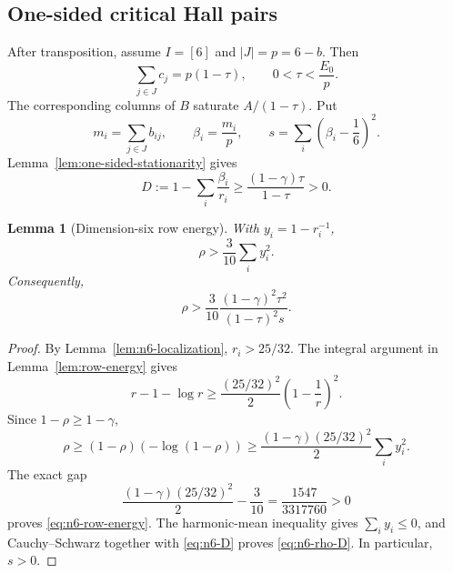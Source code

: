 \documentclass[11pt]{article}
\newtheorem{lemma}[theorem]{Lemma}
\theoremstyle{definition}
\newcommand{\1}{\mathbf{1}}
\begin{document}
\subsection{One-sided critical Hall pairs}

After transposition, assume $I=[6]$ and $|J|=p=6-b$.  Then
\begin{equation}\label{eq:n6-one-sided-mass}
 \sum_{j\in J}c_j=p(1-\tau),
 \qquad
 0<\tau<\frac{E_0}{p}.
\end{equation}
The corresponding columns of $B$ saturate $A/(1-\tau)$.  Put
\[
 m_i=\sum_{j\in J}b_{ij},
 \qquad
 \beta_i=\frac{m_i}{p},
 \qquad
 s=\sum_i\left(\beta_i-\frac16\right)^2.
\]
Lemma~\ref{lem:one-sided-stationarity} gives
\begin{equation}\label{eq:n6-D}
 D:=1-\sum_i\frac{\beta_i}{r_i}
 \ge\frac{(1-\gamma)\tau}{1-\tau}>0.
\end{equation}

\begin{lemma}[Dimension-six row energy]\label{lem:n6-row-energy}
With $y_i=1-r_i^{-1}$,
\begin{equation}\label{eq:n6-row-energy}
 \rho>\frac3{10}\sum_i y_i^2.
\end{equation}
Consequently,
\begin{equation}\label{eq:n6-rho-D}
 \rho>\frac3{10}
 \frac{(1-\gamma)^2\tau^2}{(1-\tau)^2s}.
\end{equation}
\end{lemma}

\begin{proof}
By Lemma~\ref{lem:n6-localization}, $r_i>25/32$.  The integral argument in
Lemma~\ref{lem:row-energy} gives
\[
 r-1-\log r\ge\frac{(25/32)^2}{2}
 \left(1-\frac1r\right)^2.
\]
Since $1-\rho\ge1-\gamma$,
\[
 \rho\ge(1-\rho)(-\log(1-\rho))
 \ge\frac{(1-\gamma)(25/32)^2}{2}\sum_i y_i^2.
\]
The exact gap
\begin{equation}\label{eq:n6-energy-gap}
 \frac{(1-\gamma)(25/32)^2}{2}-\frac3{10}
 =\frac{1547}{3317760}>0
\end{equation}
proves \eqref{eq:n6-row-energy}.  The harmonic-mean inequality gives
$\sum_i y_i\le0$, and Cauchy--Schwarz together with
\eqref{eq:n6-D} proves \eqref{eq:n6-rho-D}.  In particular, $s>0$.
\end{proof}
\end{document}

